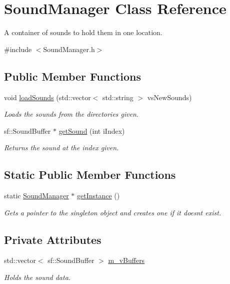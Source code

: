 \hypertarget{class_sound_manager}{}\section{Sound\+Manager Class Reference}
\label{class_sound_manager}


A container of sounds to hold them in one location.  




{\ttfamily \#include $<$Sound\+Manager.\+h$>$}

\subsection*{Public Member Functions}
\begin{DoxyCompactItemize}
\item 
void \hyperlink{class_sound_manager_ad874a868b3a3f0ae5c733d062c0a43c8}{load\+Sounds} (std\+::vector$<$ std\+::string $>$ vs\+New\+Sounds)
\begin{DoxyCompactList}\small\item\em Loads the sounds from the directories given. \end{DoxyCompactList}\item 
sf\+::\+Sound\+Buffer $\ast$ \hyperlink{class_sound_manager_a4710f7e9c6658adf6e47b5513a1c5e9f}{get\+Sound} (int i\+Index)
\begin{DoxyCompactList}\small\item\em Returns the sound at the index given. \end{DoxyCompactList}\end{DoxyCompactItemize}
\subsection*{Static Public Member Functions}
\begin{DoxyCompactItemize}
\item 
static \hyperlink{class_sound_manager}{Sound\+Manager} $\ast$ \hyperlink{class_sound_manager_a9833fc5e9b1c06e900af63eade30bcd8}{get\+Instance} ()
\begin{DoxyCompactList}\small\item\em Gets a pointer to the singleton object and creates one if it doesnt exist. \end{DoxyCompactList}\end{DoxyCompactItemize}
\subsection*{Private Attributes}
\begin{DoxyCompactItemize}
\item 
std\+::vector$<$ sf\+::\+Sound\+Buffer $>$ \hyperlink{class_sound_manager_a078a8ded7496de333a579540b7c5024f}{m\+\_\+v\+Buffers}
\begin{DoxyCompactList}\small\item\em Holds the sound data. \end{DoxyCompactList}\end{DoxyCompactItemize}
